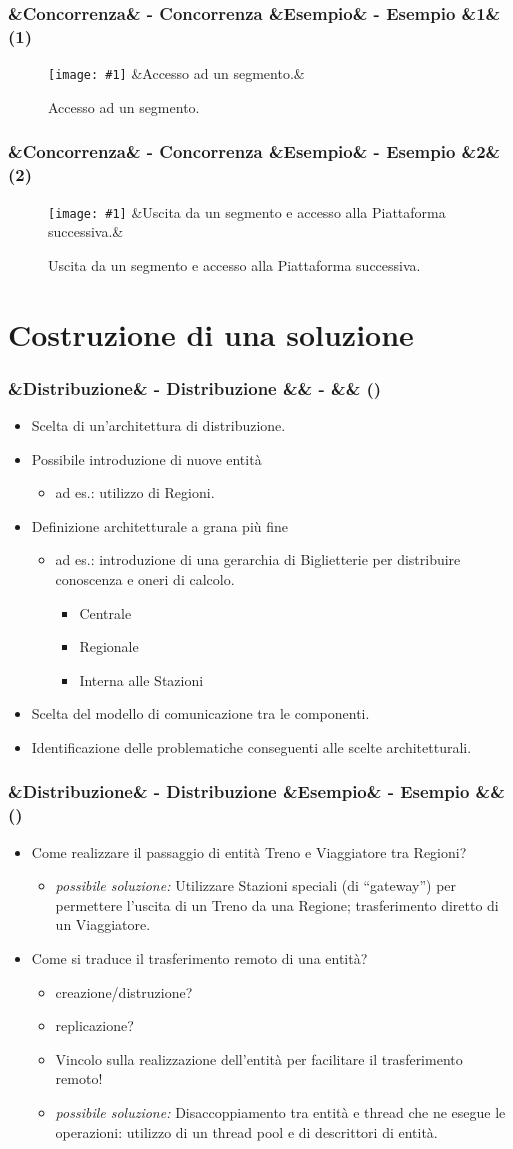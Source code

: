 \documentclass[slidestop,compress,blackandwhite]{beamer}
\newcommand{\ii}[1]{\textit{#1}}
\newcommand{\newtitle}[4]{
	#1 
	\ifx&#2&%
	\else
  		\large- #2
	\fi
	\ifx&#3&%
	\else
  		\normalsize- #3
	\fi
	\ifx&#4&%
	\else
  		\normalsize (#4)
	\fi
}
\newcommand{\newframe}[5]{
	\begin{frame}
		\frametitle{\newtitle{#1}{#2}{#3}{#4}}
		#5
	\end{frame}
}
\newcommand{\myitemize}[1]{
	\begin{itemize}\itemsep4pt
	#1
	\end{itemize}
}
\newcommand{\newfigure}[3]{
	\begin{figure}
		\centering
		\texttt{[image: \#1]}
		\ifx&#3&%
		\else
	  		\caption{\scriptsize #3}
		\fi
	\end{figure}
}
\begin{document}
	\newframe{}{Concorrenza}{Esempio}{1}{
		\newfigure{imgs/ingresso_segmento}{0.5}{Accesso ad un segmento.}
	}
	
	\newframe{}{Concorrenza}{Esempio}{2}{
		\newfigure{imgs/ingresso_stazione}{0.5}{Uscita da un segmento e accesso alla Piattaforma successiva.}
	}
	
	
	
\section{Costruzione di una soluzione}\label{sol}

	\newframe{}{Distribuzione}{}{} {
		\myitemize {
			\item Scelta di un'architettura di distribuzione.
			\item Possibile introduzione di nuove entità
				\myitemize {
					\item ad es.: utilizzo di Regioni.
				}
			\item Definizione architetturale a grana più fine
				\myitemize {
					\item ad es.: introduzione di una gerarchia di Biglietterie per distribuire conoscenza e oneri di calcolo.
						\myitemize {
							\item Centrale
							\item Regionale
							\item Interna alle Stazioni
						}
				}
			\item Scelta del modello di comunicazione tra le componenti.
			\item Identificazione delle problematiche conseguenti alle scelte architetturali.
				
		}
	}

	\newframe{}{Distribuzione}{Esempio}{} {
		\myitemize {
			\item Come realizzare il passaggio di entità Treno e Viaggiatore tra Regioni?
				\myitemize {
					\item \ii{possibile soluzione:} Utilizzare Stazioni speciali (di ``gateway'') per permettere l'uscita di un Treno da una Regione; trasferimento diretto di un Viaggiatore.
				}
			\item Come si traduce il trasferimento remoto di una entità?
				\myitemize {
					\item creazione/distruzione?
					\item replicazione?
					\item Vincolo sulla realizzazione dell'entità per facilitare il trasferimento remoto!
					\item \ii{possibile soluzione:} Disaccoppiamento tra entità e thread che ne esegue le operazioni: utilizzo di un thread pool e di descrittori di entità.
				}
		}
	}
	
\end{document}

